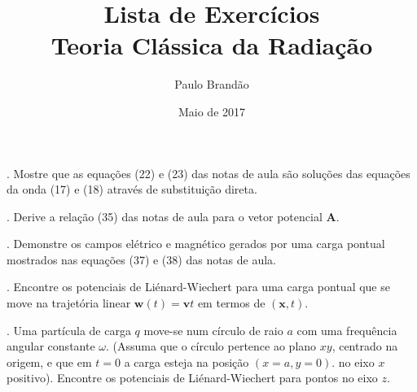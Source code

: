 \documentclass{article}
\title{\color{astral}\textbf{Lista de Exercícios} \\ \textbf{Teoria Clássica da Radiação}}
\author{Paulo Brandão}
\date{Maio de 2017}
\begin{document}
\maketitle

. Mostre que as equações (22) e (23) das notas de aula são soluções das equações da onda (17) e (18) através de substituição direta.

\vspace{1cm}

. Derive a relação (35) das notas de aula para o vetor potencial $\mathbf{A}$.

\vspace{1cm}

. Demonstre os campos elétrico e magnético gerados por uma carga pontual mostrados nas equações (37) e (38) das notas de aula.

\vspace{1cm}

. Encontre os potenciais de Liénard-Wiechert para uma carga pontual que se move na trajetória linear $\mathbf{w}(t) = \mathbf{v}t$ em termos de $(\mathbf{x},t)$.

\vspace{1cm}

. Uma partícula de carga $q$ move-se num círculo de raio $a$ com uma frequência angular constante $\omega$. (Assuma que o círculo pertence ao plano $xy$, centrado na origem, e que em $t=0$ a carga esteja na posição $(x=a,y=0)$. no eixo $x$ positivo). Encontre os potenciais de Liénard-Wiechert para pontos no eixo $z$.
\end{document}
